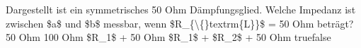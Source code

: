     {Dargestellt ist ein symmetrisches 50 Ohm Dämpfungsglied. Welche Impedanz ist zwischen \$a\$ und \$b\$ messbar, wenn \$R\_\{\textbackslash\{\}textrm\{L\}\}\$ = 50 Ohm beträgt?}
    {50 Ohm}
    {100 Ohm}
    {\$R\_1\$ + 50 Ohm}
    {\$R\_1\$ + \$R\_2\$ + 50 Ohm}
    {true}{false}